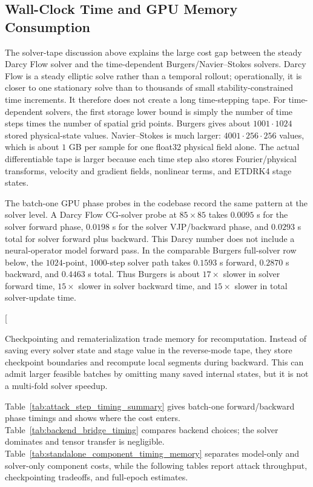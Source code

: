 \documentclass[letterpaper]{article} %
\begin{document}
\subsection*{Wall-Clock Time and GPU Memory Consumption}

The solver-tape discussion above explains the large cost gap between the steady
Darcy Flow solver and the time-dependent Burgers/Navier--Stokes solvers. Darcy
Flow is a steady elliptic solve rather than a temporal rollout; operationally,
it is closer to one stationary solve than to thousands of small
stability-constrained time increments. It therefore does not create a long
time-stepping tape. For time-dependent solvers, the first storage lower bound is
simply the number of time steps times the number of spatial grid points. Burgers
gives about $1001\cdot1024$ stored physical-state values. Navier--Stokes is much
larger: $4001\cdot256\cdot256$ values, which is about $1$ GB per sample for one
float32 physical field alone. The actual differentiable tape is larger because
each time step also stores Fourier/physical transforms, velocity and gradient
fields, nonlinear terms, and ETDRK4 stage states.

The batch-one GPU phase probes in the codebase record the same pattern at the
solver level. A Darcy Flow CG-solver probe at $85\times85$ takes $0.0095$ s for
the solver forward phase, $0.0198$ s for the solver VJP/backward phase, and
$0.0293$ s total for solver forward plus backward. This Darcy number does not
include a neural-operator model forward pass. In the comparable Burgers
full-solver row below, the $1024$-point, $1000$-step solver path takes $0.1593$ s
forward, $0.2870$ s backward, and $0.4463$ s total. Thus Burgers is about
$17\times$ slower in solver forward time, $15\times$ slower in solver backward
time, and $15\times$ slower in total solver-update time.

\clearpage
\twocolumn[
\noindent
\begin{minipage}{0.485\textwidth}
\setlength{\parindent}{1em}
Checkpointing and rematerialization trade memory for recomputation. Instead of
saving every solver state and stage value in the reverse-mode tape, they store
checkpoint boundaries and recompute local segments during backward. This can
admit larger feasible batches by omitting many saved internal states, but it is
not a multi-fold solver speedup.
\end{minipage}\hfill
\begin{minipage}{0.485\textwidth}
\setlength{\parindent}{1em}
Table~\ref{tab:attack_step_timing_summary} gives batch-one forward/backward phase timings and shows where the cost
enters. Table~\ref{tab:backend_bridge_timing} compares backend choices; the solver dominates and tensor
transfer is negligible. Table~\ref{tab:standalone_component_timing_memory} separates model-only and solver-only component
costs, while the following tables report attack throughput, checkpointing
tradeoffs, and full-epoch estimates.
\end{minipage}
\vspace{0.25em}
\end{document}
